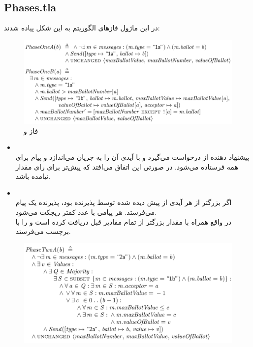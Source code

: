 \documentclass{article}
\begin{document}
\begin{multicols}{2}
\subsection*{Phases.tla}
در این ماژول فازهای الگوریتم به این شکل پیاده شدند:
\begin{figure}[H]
    \centering
    \includegraphics[width=0.99\linewidth]{Photos/HW6/one.png}
    \caption{
    فاز
    و
    }
    \label{fig:my_label}
\end{figure}
\begin{itemize}
    \item {}\\
    پیشنهاد دهنده از
    درخواست می‌گیرد و با آیدی
    آن را به جریان می‌اندازد و پیام
    برای همه فرستاده می‌شود.
    در صورتی این اتفاق می‌افتد که پیش‌تر برای رای
    مقدار
    نیامده باشد.
    \item {}\\
    اگر
    بزرگتر از هر آیدی از پیش دیده شده توسط پذیرنده بود، پذیرنده یک پیام
    می‌فرستد. هر پیامی با عدد کمتر ریجکت می‌شود.\\
    در واقع همراه با
    مقدار
    بزرگتر از تمام مقادیر قبل دریافت کرده است و
    را با برچسب
    می‌فرستد.
\end{itemize}
\begin{figure}[H]
    \centering
    \includegraphics[width=0.99\linewidth]{Photos/HW6/twoA.png}

\end{figure}
\end{multicols}
\end{document}
